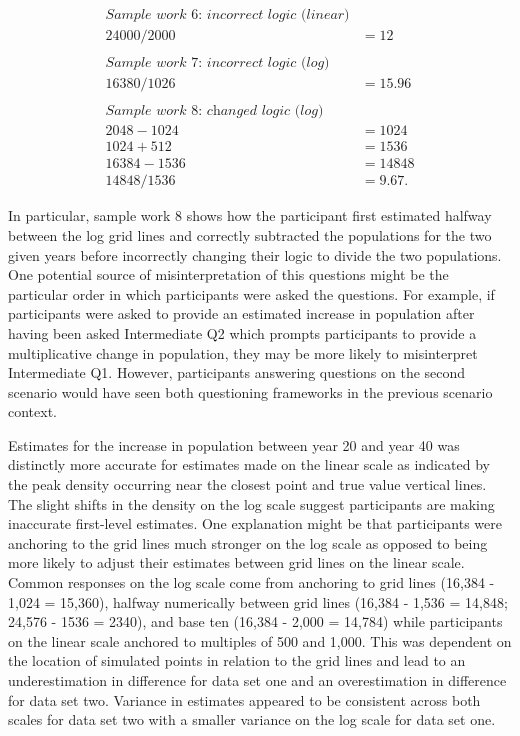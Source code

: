 \documentclass[print]{nuthesis}
\begin{document}
\begin{align}
\textit{Sample work 6: incorrect logic (linear)} \nonumber\\
24000/2000&=12 \nonumber\\
\nonumber \\ 
\textit{Sample work 7: incorrect logic (log)} \nonumber\\
16380/1026&=15.96\nonumber\\
\nonumber \\ 
\textit{Sample work 8: changed logic (log)} \nonumber\\
2048-1024&=1024\nonumber\\
1024+512&=1536\nonumber\\
16384-1536&=14848\nonumber\\
14848/1536&=9.67.\nonumber
\end{align}

In particular, sample work 8 shows how the participant first estimated halfway between the log grid lines and correctly subtracted the populations for the two given years before incorrectly changing their logic to divide the two populations.
One potential source of misinterpretation of this questions might be the particular order in which participants were asked the questions.
For example, if participants were asked to provide an estimated increase in population after having been asked Intermediate Q2 which prompts participants to provide a multiplicative change in population, they may be more likely to misinterpret Intermediate Q1.
However, participants answering questions on the second scenario would have seen both questioning frameworks in the previous scenario context.

Estimates for the increase in population between year 20 and year 40 was distinctly more accurate for estimates made on the linear scale as indicated by the peak density occurring near the closest point and true value vertical lines.
The slight shifts in the density on the log scale suggest participants are making inaccurate first-level estimates.
One explanation might be that participants were anchoring to the grid lines much stronger on the log scale as opposed to being more likely to adjust their estimates between grid lines on the linear scale.
Common responses  on the log scale come from anchoring to grid lines (16,384 - 1,024 = 15,360), halfway numerically between grid lines (16,384 - 1,536 = 14,848; 24,576 - 1536 = 2340), and base ten (16,384 - 2,000 = 14,784) while participants on the linear scale anchored to multiples of 500 and 1,000.
This was dependent on the location of simulated points in relation to the grid lines and lead to an underestimation in difference for data set one and an overestimation in difference for data set two.
Variance in estimates appeared to be consistent across both scales for data set two with a smaller variance on the log scale for data set one.
\end{document}
